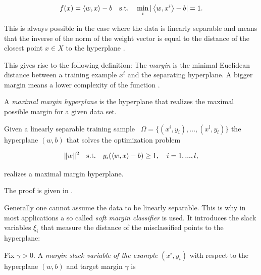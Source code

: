 \[ f(x) = \left\langle w, x\right\rangle - b  \quad \text{s.t.} \quad \min_i \vert\left\langle w,x^i\right\rangle -b\vert = 1.\] 

This is always possible in the case where the data is  linearly separable and means that the inverse of the norm of the weight vector is equal to the distance of the closest point \(x \in X \) to  the hyperplane \cite[p. 10]{Kunapuli2008}.



This gives rise to the following definition:
The \emph{margin} is the minimal Euclidean distance between a training example \(x^i\) and the separating hyperplane.
A bigger margin means a lower complexity of the function \cite{Cristianini2000}. 

A \emph{maximal margin hyperplane} is the hyperplane that realizes the maximal possible margin for a given data set.

\begin{proposition}
Given a linearly separable training sample \ \(\Omega = \{(x^i,y_i),...,(x^l,y_l)\}\) the hyperplane \((w,b)\) that solves the optimization problem

\[\|w\|^2 \quad \text{s.t.} \quad y_i(\left\langle w,x\right\rangle-b)\geq 1, \quad i = 1,...,l, \]

realizes a maximal margin hyperplane.
\end{proposition}

The proof is given in \cite[chapter 6.1]{Cristianini2000}. 

Generally one cannot assume the data to be linearly separable. This is why in most applications a so called \emph{soft margin classifier} is used. It introduces the slack variables \(\xi_i\) that measure the distance of the misclassified points to the hyperplane:


Fix \(\gamma > 0\). A \emph{margin slack variable of the example} \((x^i,y_i)\) with respect to the hyperplane \((w,b)\) and target margin \(\gamma\) is 

